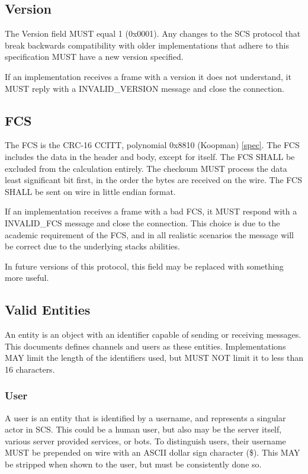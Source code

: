 \documentclass[12pt]{article}
\begin{document}
\subsection{Version}
The Version field MUST equal 1 (0x0001). Any changes to the SCS protocol that
break backwards compatibility with older implementations that adhere to this
specification MUST have a new version specified.

If an implementation receives a
frame with a version it does not understand, it MUST reply with a
INVALID\_VERSION message and close the connection.
\subsection{FCS}
The FCS is the CRC-16 CCITT, polynomial 0x8810 (Koopman)
\href{https://users.ece.cmu.edu/~koopman/crc/c16/0x8810.txt}{[spec]}.
The FCS includes the data in the header and body, except for itself. 
The FCS SHALL be excluded from the calculation entirely. The checksum MUST process the data least significant
bit first, in the order the bytes are received on the wire. The FCS SHALL be
sent on wire in little endian format. 

If an implementation receives a frame with
a bad FCS, it MUST respond with a INVALID\_FCS message and close the connection. This
choice is due to the academic requirement of the FCS, and in all realistic
scenarios the message will be correct due to the underlying stacks abilities.

In future versions of this protocol, this field may be replaced with something
more useful.

\subsection{Valid Entities}
An entity is an object with an identifier capable of sending or receiving
messages. This documents defines channels and users as these entities.
Implementations MAY limit the length of the identifiers used, but MUST NOT limit
it to less than 16 characters.
\subsubsection{User}
A user is an entity that is identified by a username, and represents a singular
actor in SCS. This could be a human user, but also may be the server itself,
various server provided services, or bots. To distinguish users, their username
MUST be prepended on wire with an ASCII dollar sign character (\$). This MAY be
stripped when shown to the user, but must be consistently done so.
\end{document}
